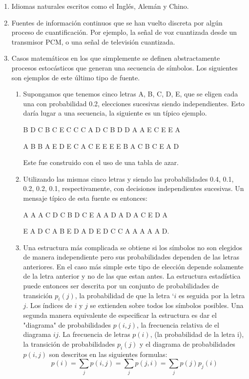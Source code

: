 \begin{enumerate}
\item Idiomas naturales escritos como el Ingl\'es, Alem\'an y Chino.
\item Fuentes de informaci\'on continuos que se han vuelto discreta por alg\'un proceso 
de cuantificaci\'on. Por ejemplo, la se\~nal de voz cuantizada desde un transmisor PCM, o 
una se\~nal de televisi\'on cuantizada.
\item Casos matem\'aticos en los que simplemente se definen abstractamente procesos estoc\'asticos 
que generan una secuencia de s\'imbolos. Los siguientes son ejemplos de este \'ultimo tipo de fuente.
\begin{enumerate}
\item Supongamos que tenemos cinco letras A, B, C, D, E, que se eligen cada una con probabilidad 0.2, 
elecciones sucesivas siendo independientes. Esto dar\'ia lugar a una secuencia, la siguiente 
es un t\'ipico ejemplo.

B D C B C E C C C A D C B D D A A E C E E A

A B B A E D E C A C E E E E B A C B C E A D

Este fue construido con el uso de una tabla de azar.
\item Utilizando las mismas cinco letras y siendo las probabilidades 0.4, 0.1, 
0.2, 0.2, 0.1, respectivamente, con decisiones independientes sucesivas. Un mensaje 
t\'ipico de esta fuente es entonces:

A A A C D C B D C E A A D A D A C E D A

E A D C A B E D A D E D C C A A A A A D.

\item Una estructura m\'as complicada se obtiene si los s\'imbolos no son elegidos 
de manera independiente pero sus probabilidades dependen de las letras anteriores. En 
el caso m\'as simple este tipo de elecci\'on depende solamente de la letra anterior y no
de las que estan antes. La estructura estad\'istica puede entonces ser descrita por un 
conjunto de probabilidades de transici\'on $p_{i}(j)$, la probabilidad de que la letra `$i$ 
es seguida por la letra $j$. Los \'indices de $i$ y $j$ se extienden sobre todos los 
s\'imbolos posibles. Una segunda manera equivalente de especificar la estructura es dar 
el "diagrama" de probabilidades $p(i,j)$, la frecuencia relativa de el diagrama $i j$.
La frecuencia de letras $p(i)$, (la probabilidad de la letra i), la transici\'on de 
probabilidades $p_{i}(j)$ y el diagrama de probabilidades $p(i,j)$ son descritos en las 
siguientes formulas:
\begin{equation}
p(i)=\sum_{j}p(i,j)=\sum_{j}p(j,i)=\sum_{j}p(j)p_{j}(i) 
\end{equation}
\end{enumerate}
\end{enumerate}
